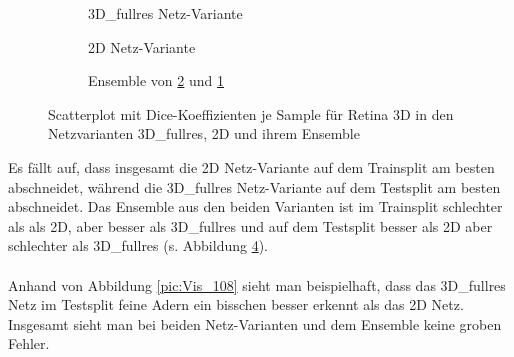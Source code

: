 \begin{figure}[H]
\begin{minipage}{.3\textwidth}
\begin{subfigure}{\textwidth}

\caption{3D\_fullres Netz-Variante}
\label{pic:Dice_108-3dfullres}
\end{subfigure}
\end{minipage}
\begin{minipage}{.3\textwidth}
\begin{subfigure}{\textwidth}

\caption{2D Netz-Variante}
\label{pic:Dice_108-2d}
\end{subfigure}
\end{minipage}
\begin{minipage}{.3\textwidth}
\begin{subfigure}{\textwidth}

\caption{Ensemble von \ref{pic:Dice_108-2d} und \ref{pic:Dice_108-3dfullres}}
\label{pic:Dice_108-ensemble}
\end{subfigure}
\end{minipage}
\caption{Scatterplot mit Dice-Koeffizienten je Sample für Retina 3D in den Netzvarianten 3D\_fullres, 2D und ihrem Ensemble}
\label{pic:Dice_108}
\end{figure}


Es fällt auf, dass insgesamt die 2D Netz-Variante auf dem Trainsplit am besten abschneidet, während die 3D\_fullres Netz-Variante auf dem Testsplit am besten abschneidet. Das Ensemble aus den beiden Varianten ist im Trainsplit schlechter als als 2D, aber besser als 3D\_fullres und auf dem Testsplit besser als 2D aber schlechter als 3D\_fullres (s. Abbildung \ref{pic:Dice_108}).\\\\
Anhand von Abbildung \ref{pic:Vis_108} sieht man beispielhaft, dass das 3D\_fullres Netz im Testsplit feine Adern ein bisschen besser erkennt als das 2D Netz. Insgesamt sieht man bei beiden Netz-Varianten und dem Ensemble keine groben Fehler.


